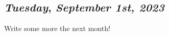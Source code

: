 \begin{center}
\section*{\month}
\end{center}

\def\day{\textit{September 1st, 2023}}
\def\weekday{\textit{Tuesday}}
\subsection*{\weekday, \day}

Write some more the next month! 